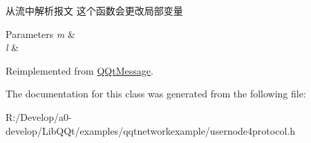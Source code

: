 从流中解析报文 这个函数会更改局部变量 


\begin{DoxyParams}{Parameters}
{\em m} & \\
\hline
{\em l} & \\
\hline
\end{DoxyParams}


Reimplemented from \mbox{\hyperlink{class_q_qt_message_a0bc25669bdd61490b1d8df6d77565f31}{Q\+Qt\+Message}}.



The documentation for this class was generated from the following file\+:\begin{DoxyCompactItemize}
\item 
R\+:/\+Develop/a0-\/develop/\+Lib\+Q\+Qt/examples/qqtnetworkexample/usernode4protocol.\+h\end{DoxyCompactItemize}
